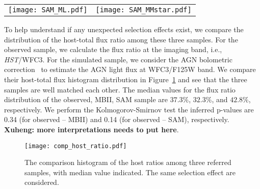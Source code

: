 \documentclass{natureprintstyle}
\newcommand{\hst}{{\it HST}}
\begin{document}
\begin{figure*}[t]%
\begin{tabular}{c c}
\texttt{[image: SAM\_ML.pdf]} &
\texttt{[image: SAM\_MMstar.pdf]} \\
\end{tabular}
\caption{ Similar to the Figure~\ref{fig:MBII_comp}, we compare the observation to the SAM models. The blue background contours show the overall sample distribution and the red ones are the relations after considering the selecting effect. We see that the yellow contours are well matched to the hot zones for the red contours.
}
\label{fig:SAM_comp}
\end{figure*}

To help understand if any unexpected selection effects exist, we compare the distribution of the host-total flux ratio among these three samples. For the observed sample, we calculate the flux ratio at the imaging band, i.e., \hst/WFC3. For the simulated sample, we consider the AGN bolometric correction~\cite{Elvis1994} to estimate the AGN light flux at WFC3/F125W band. We compare their host-total flux histogram distribution in Figure~\ref{fig:comp_hist} and see that the three samples are well matched each other. The median values for the flux ratio distribution of the observed, MBII, SAM sample are $37.3\%$, $32.3\%$, and $42.8\%$, respectively. We perform the Kolmogorov-Smirnov test the inferred p-values are 0.34 (for observed -- MBII) and 0.14 (for observed -- SAM), respectively. {\bf Xuheng: more interpretations needs to put here}.

\begin{figure}[t]
\texttt{[image: comp\_host\_ratio.pdf]}
\caption{The comparison histogram of the host ratios among three referred samples, with median value indicated. The same selection effect are considered.
}
\label{fig:comp_hist}
\end{figure}
\end{document}
